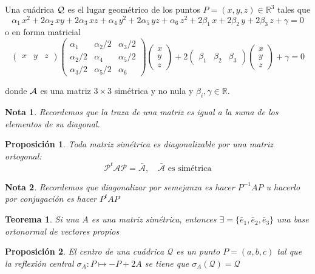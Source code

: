 \documentclass[11pt, a4paper]{article}
\newif\IfInSansMode
\theoremstyle{theorem-style}
\newtheorem{nth}{Teorema}[section]
\newtheorem{nprop}{Proposición}[section]
\theoremstyle{definition-style}
\theoremstyle{remark-style}
\newtheorem*{nota}{Nota}
\theoremstyle{example-style}
\begin{document}
Una cuádrica  $\cal Q$ es el lugar geométrico de los puntos $P=(x,y,z)\in\mathbb{R}^3$ tales que
\[ 
\alpha_1 \,x^2 + 2\alpha_2 \,x y + 2\alpha_3\,x z + \alpha_4 \,y^2 + 2 \alpha_5 \,y z + \alpha_6 \,z^2 
+ 2\beta_1 \,x+ 2\beta_2 \,y +2 \beta_3 \,z + \gamma = 0
\]
o en forma matricial 
\[  
\left( \begin{array}{ccc} 
x & y & z   
 \end{array} \right)\begin{pmatrix}
 \alpha_1 & \alpha_2 / 2 &\alpha_3 / 2\\
 \alpha_2 / 2 & \alpha_4 &\alpha_5 / 2\\
 \alpha_3 / 2& \alpha_5 / 2& \alpha_6
\end{pmatrix} 
\left(\begin{array}{c}
x \\
y \\
z
\end{array} \right)
+
 2\left( \begin{array}{ccc}
\beta_1 & \beta_2 & \beta_3   
 \end{array} \right)
\left( \begin{array}{c}
x \\
y \\
z
 \end{array} \right)
+ \gamma = 0
\]

donde $\cal A$ es una matriz $3\times 3$ simétrica y no nula y $\beta_i, \gamma\in\mathbb{R}$. 

\begin{nota}
	Recordemos que la traza de una matriz es igual a la suma de los elementos de su diagonal.
\end{nota}

\begin{nprop}
	Toda matriz simétrica es diagonalizable por una matriz ortogonal:
	\[
	\mathcal P ^t \mathcal A \mathcal P = \bar{ \mathcal A}, \quad \text{$\bar{\mathcal A}$ es simétrica}
	\]
\end{nprop}
\begin{nota}
	Recordemos que diagonalizar por semejanza es hacer $P^{-1}AP$ u hacerlo por conjugación es hacer $P^t A P$
\end{nota}

\begin{nth}
	Si una $A$ es una matriz simétrica, entonces $\exists = \{\bar e_1, \bar e_2, \bar e_3\}$ una base ortonormal de vectores propios
\end{nth}

\begin{nprop}
	El centro de una cuádrica $\mathcal Q$ es un punto $P=(a,b,c)$ tal que la reflexión central $\sigma_A: P \mapsto -P+2A$ se tiene que $\sigma_A (\mathcal Q) = \mathcal Q$
\end{nprop}
\end{document}
